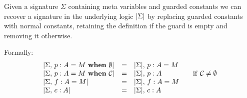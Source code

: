 

\begin{definition}
    Given a signature $\Sigma$ containing meta variables and guarded constants
    we can recover a signature in the underlying logic $\left|{\Sigma}\right|$ by
    replacing guarded constants with normal constants, retaining the definition
    if the guard is empty and removing it otherwise.

    Formally:
    \[\begin{array}{lclcl}
	\left|{{\Sigma},\,{} {p} : {A} = {M} ~\mathbf{when}~ {\emptyset}}\right|
	    & = & {\left|{\Sigma}\right|},\,{} {{p} : {A} = {M}} \\
	\left|{{\Sigma},\,{} {p} : {A} = {M} ~\mathbf{when}~ {\mathcal{C}}}\right|
	    & = & {\left|{\Sigma}\right|},\,{} {{p} : {A}} && \mathrm{if} ~ \mathcal{C} \neq \emptyset \\
	\left|{{\Sigma},\,{} {f} : {A} = {M}}\right|
	    & = & {\left|{\Sigma}\right|},\,{} {{f} : {A} = {M}} \\
	\left|{{\Sigma},\,{} {c} : {A}}\right|
	    & = & {\left|{\Sigma}\right|},\,{} {{c} : {A}} \\
    \end{array}\]
\end{definition}

